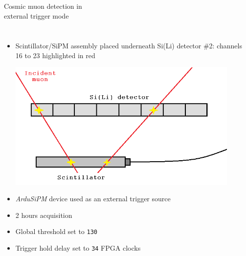 \documentclass[aspectratio=169,xcolor=dvipsnames,handout]{beamer} %
\begin{document}
\begin{frame}{Cosmic muon detection in\\ \vskip-0.15cm external trigger mode}
    \addtolength{\leftmargini}{\labelsep}
    \fontsize{9pt}{1}\selectfont

    \begin{columns}
        \begin{itemize}
            \item Scintillator/SiPM assembly placed underneath Si(Li) detector \#2: channels 16 to 23 highlighted in red

            \vskip0.4cm
            \includegraphics[width=0.9\textwidth]{images/muon_detection/scintillator_sensor_detail.png}

            \vskip0.4cm
            \item \textit{ArduSiPM} device used as an external trigger source
            \item 2 hours acquisition
            \item Global threshold set to \texttt{130}
            \item Trigger hold delay set to \texttt{34} FPGA clocks
            
        \end{itemize}


\end{columns}
\end{frame}
\end{document}
